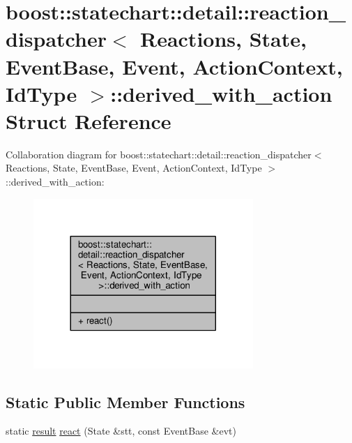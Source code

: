 \hypertarget{structboost_1_1statechart_1_1detail_1_1reaction__dispatcher_1_1derived__with__action}{}\section{boost\+:\+:statechart\+:\+:detail\+:\+:reaction\+\_\+dispatcher$<$ Reactions, State, Event\+Base, Event, Action\+Context, Id\+Type $>$\+:\+:derived\+\_\+with\+\_\+action Struct Reference}
\label{structboost_1_1statechart_1_1detail_1_1reaction__dispatcher_1_1derived__with__action}


Collaboration diagram for boost\+:\+:statechart\+:\+:detail\+:\+:reaction\+\_\+dispatcher$<$ Reactions, State, Event\+Base, Event, Action\+Context, Id\+Type $>$\+:\+:derived\+\_\+with\+\_\+action\+:
\nopagebreak
\begin{figure}[H]
\begin{center}
\leavevmode
\includegraphics[width=236pt]{structboost_1_1statechart_1_1detail_1_1reaction__dispatcher_1_1derived__with__action__coll__graph}
\end{center}
\end{figure}
\subsection*{Static Public Member Functions}
\begin{DoxyCompactItemize}
\item 
static \mbox{\hyperlink{namespaceboost_1_1statechart_abe807f6598b614d6d87bb951ecd92331}{result}} \mbox{\hyperlink{structboost_1_1statechart_1_1detail_1_1reaction__dispatcher_1_1derived__with__action_a8c48c84fe8d00b7850d347d539733e0d}{react}} (State \&stt, const Event\+Base \&evt)
\end{DoxyCompactItemize}


